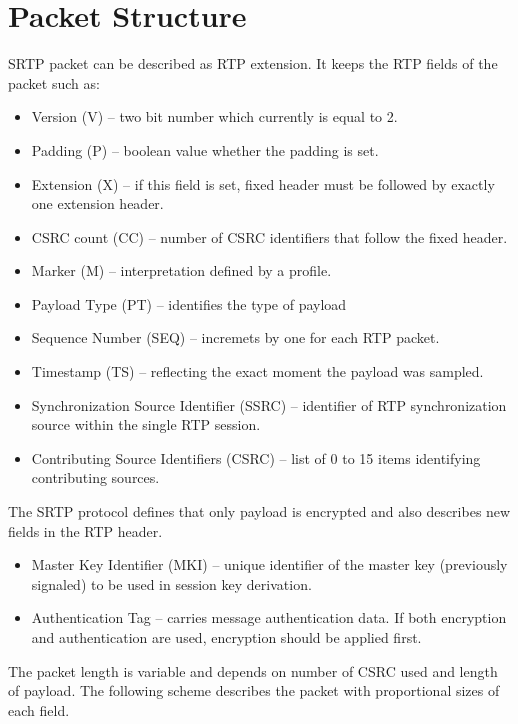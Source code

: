 \section{Packet Structure}
SRTP packet can be described as RTP extension. It keeps the RTP fields of
the packet such as:
\begin{itemize}
\item Version (V) -- two bit number which currently is equal to 2.
\item Padding (P) -- boolean value whether the padding is set.
\item Extension (X) -- if this field is set, fixed header must be followed by
exactly one extension header.
\item CSRC count (CC) -- number of CSRC identifiers that follow the fixed 
header.
\item Marker (M) -- interpretation defined by a profile.
\item Payload Type (PT) -- identifies the type of payload
\item Sequence Number (SEQ) -- incremets by one for each RTP packet.
\item Timestamp (TS) -- reflecting the exact moment the payload was sampled.
\item Synchronization Source Identifier (SSRC) -- identifier of RTP 
synchronization source within the single RTP session.
\item Contributing Source Identifiers (CSRC) -- list of 0 to 15 items 
identifying contributing sources.
\end{itemize}

The SRTP protocol defines that only payload is encrypted and also describes new 
fields in the RTP header.

\begin{itemize}
\item Master Key Identifier (MKI) -- unique identifier of the master key 
(previously signaled) to be used in session key derivation.
\item Authentication Tag -- carries message authentication data. If both
encryption and authentication are used, encryption should be applied first.
\end{itemize}

The packet length is variable and depends on number of CSRC used and length
of payload. The following scheme describes the packet with proportional
sizes of each field.

